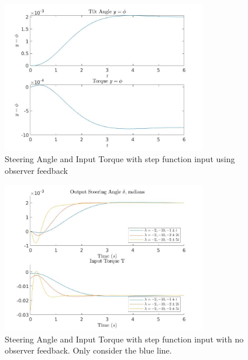 \documentclass[11pt]{article}
\theoremstyle{definition}
\begin{document}
\begin{enumerate}
\begin{enumerate}
        \begin{figure}
            \centering
            \includegraphics[width = 0.8\textwidth]{ES155P5_2_bicycle.jpg}
            \caption{Steering Angle and Input Torque with step function input using observer feedback}
            \label{fig:HW5_2_c}
        \end{figure}

        \begin{figure}
            \centering
            \includegraphics[width = 0.8\textwidth]{../P4/ES155P4_2_bicycleStepResponse.jpg}
            \caption{Steering Angle and Input Torque with step function input with no observer feedback.  Only consider the blue line.}
            \label{fig:HW4_2_c}
        \end{figure}

        


    \end{enumerate}

\end{enumerate}
\end{document}
